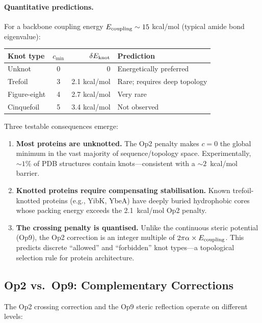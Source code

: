 \paragraph{Quantitative predictions.}
For a backbone coupling energy $E_{\rm coupling} \sim 15$
kcal/mol (typical amide bond eigenvalue):
\begin{center}
\renewcommand{\arraystretch}{1.2}
\begin{tabular}{l c r l}
\textbf{Knot type} & $c_{\min}$ &
    $\delta E_{\rm knot}$ & \textbf{Prediction} \\
\hline
Unknot & 0 & 0 & Energetically preferred \\
Trefoil & 3 & 2.1 kcal/mol & Rare; requires deep topology \\
Figure-eight & 4 & 2.7 kcal/mol & Very rare \\
Cinquefoil & 5 & 3.4 kcal/mol & Not observed \\
\end{tabular}
\end{center}
Three testable consequences emerge:
\begin{enumerate}
    \item \textbf{Most proteins are unknotted.}
          The Op2 penalty makes $c = 0$ the global minimum
          in the vast majority of sequence/topology space.
          Experimentally, $\sim 1\%$ of PDB structures
          contain knots---consistent with a
          $\sim 2$~kcal/mol barrier.
    \item \textbf{Knotted proteins require compensating
          stabilisation.}  Known trefoil-knotted proteins
          (e.g., YibK, YbeA) have deeply buried hydrophobic
          cores whose packing energy exceeds the
          2.1~kcal/mol Op2 penalty.
    \item \textbf{The crossing penalty is quantised.}
          Unlike the continuous steric potential (Op9),
          the Op2 correction is an integer multiple of
          $2\pi\alpha \times E_{\rm coupling}$.  This
          predicts discrete ``allowed'' and ``forbidden''
          knot types---a topological selection rule for
          protein architecture.
\end{enumerate}

\subsection{Op2 vs.\ Op9: Complementary Corrections}

The Op2 crossing correction and the Op9 steric reflection
operate on different levels:

